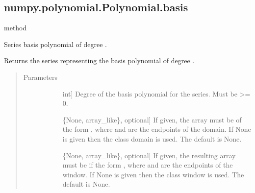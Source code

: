 \documentclass[letterpaper,10pt,english]{sphinxmanual}
\begin{document}
\begin{fulllineitems}
\subsection{numpy.polynomial.Polynomial.basis}
\label{\detokenize{generated/generated/numpy.polynomial.Polynomial.basis:numpy-polynomial-polynomial-basis}}\label{\detokenize{generated/generated/numpy.polynomial.Polynomial.basis::doc}}
method

\begin{fulllineitems}
\label{\detokenize{generated/generated/numpy.polynomial.Polynomial.basis:numpy.polynomial.Polynomial.basis}}
Series basis polynomial of degree .

Returns the series representing the basis polynomial of degree .

\begin{quote}\begin{description}
\item[{Parameters}] \leavevmode\begin{description}
\item[{}] \leavevmode{[}int{]}
Degree of the basis polynomial for the series. Must be >= 0.

\item[{}] \leavevmode{[}\{None, array\_like\}, optional{]}
If given, the array must be of the form , where
 and  are the endpoints of the domain. If None is
given then the class domain is used. The default is None.

\item[{}] \leavevmode{[}\{None, array\_like\}, optional{]}
If given, the resulting array must be if the form
, where  and  are the endpoints of
the window. If None is given then the class window is used. The
default is None.


\end{description}
\end{description}
\end{quote}
\end{fulllineitems}
\end{fulllineitems}
\end{document}
